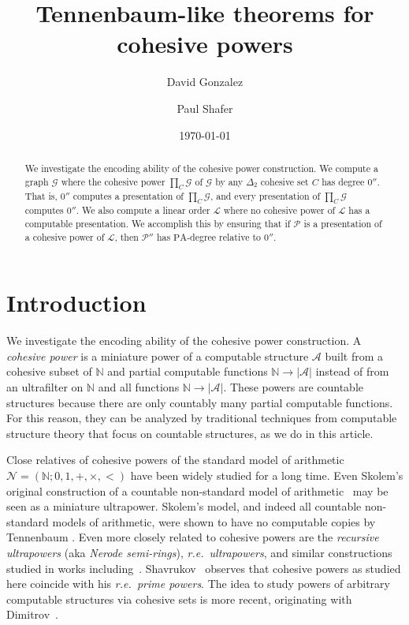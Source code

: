 \documentclass[11pt,a4paper,reqno]{amsart}
\title[Tennenbaum-like theorems for cohesive powers]{Tennenbaum-like theorems for cohesive powers}
\author{David Gonzalez}
\author{Paul Shafer}
\date{\today}
\theoremstyle{definition}
\newcommand{\pa}{\mathrm{PA}}
\newcommand{\Nb}{\mathbb{N}}
\newcommand{\mc}[1]{\mathcal{#1}}
\begin{document}
\begin{abstract}
We investigate the encoding ability of the cohesive power construction.  We compute a graph $\mc{G}$ where the cohesive power $\prod_C \mc{G}$ of $\mc{G}$ by any $\Delta_2$ cohesive set $C$ has degree $0''$.  That is, $0''$ computes a presentation of $\prod_C \mc{G}$, and every presentation of $\prod_C \mc{G}$ computes $0''$.  We also compute a linear order $\mc{L}$ where no cohesive power of $\mc{L}$ has a computable presentation.  We accomplish this by ensuring that if $\mc{P}$ is a presentation of a cohesive power of $\mc{L}$, then $\mc{P}''$ has $\pa$-degree relative to $0''$. 
\end{abstract}

\maketitle

\section{Introduction}

We investigate the encoding ability of the cohesive power construction.  A \emph{cohesive power} is a miniature power of a computable structure $\mc{A}$ built from a cohesive subset of $\Nb$ and partial computable functions $\Nb \to |\mc{A}|$ instead of from an ultrafilter on $\Nb$ and all functions $\Nb \to |\mc{A}|$.  These powers are countable structures because there are only countably many partial computable functions. 
For this reason, they can be analyzed by traditional techniques from computable structure theory that focus on countable structures, as we do in this article.

Close relatives of cohesive powers of the standard model of arithmetic $\mc{N} = (\Nb; 0, 1, +, \times, <)$ have been widely studied for a long time.  Even Skolem's original construction of a countable non-standard model of arithmetic~\cite{Skolem} may be seen as a miniature ultrapower.  Skolem's model, and indeed all countable non-standard models of arithmetic, were shown to have no computable copies by Tennenbaum \cite{Ten51}.  Even more closely related to cohesive powers are the \emph{recursive ultrapowers} (aka \emph{Nerode semi-rings}), \emph{r.e.\ ultrapowers}, and similar constructions studied in works including~\cites{FefermanScottTennenbaum, HirschfeldModels, HirschfeldWheelerBook, ShavrukovPrimePowers, McLaughlinRearrangement, McLaughlinCollectionFails, McLaughlinSurvey, McLaughlinUltrapowersModelsExtensions, McLaughlinTotallyRigid, McLaughlinEmbeddings, LermanCo-r-Max}.  
Shavrukov~\cite{ShavrukovPrimePowers} observes that cohesive powers as studied here coincide with his \emph{r.e.\ prime powers}.
The idea to study powers of arbitrary computable structures via cohesive sets is more recent, originating with Dimitrov~\cite{DimitrovCohPow}.
\end{document}

